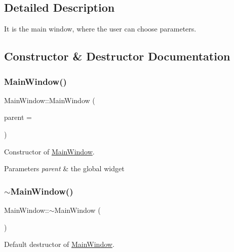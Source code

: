 \subsection{Detailed Description}
It is the main window, where the user can choose parameters. 

\subsection{Constructor \& Destructor Documentation}
\hypertarget{class_main_window_a8b244be8b7b7db1b08de2a2acb9409db}{}\label{class_main_window_a8b244be8b7b7db1b08de2a2acb9409db} 
\subsubsection{\texorpdfstring{Main\+Window()}{MainWindow()}}
{\footnotesize\ttfamily Main\+Window\+::\+Main\+Window (\begin{DoxyParamCaption}\item[{Q\+Widget $\ast$}]{parent = {} }\end{DoxyParamCaption})\hspace{0.3cm}{\ttfamily [explicit]}}



Constructor of \hyperlink{class_main_window}{Main\+Window}. 


\begin{DoxyParams}{Parameters}
{\em parent} & the global widget \\
\hline
\end{DoxyParams}
\hypertarget{class_main_window_ae98d00a93bc118200eeef9f9bba1dba7}{}\label{class_main_window_ae98d00a93bc118200eeef9f9bba1dba7} 
\subsubsection{\texorpdfstring{$\sim$\+Main\+Window()}{~MainWindow()}}
{\footnotesize\ttfamily Main\+Window\+::$\sim$\+Main\+Window (\begin{DoxyParamCaption}{ }\end{DoxyParamCaption})}



Default destructor of \hyperlink{class_main_window}{Main\+Window}. 




